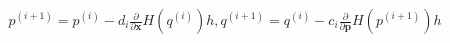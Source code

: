 \documentclass[preview]{standalone}
\begin{document}
\begin{align*}
p^{(i+1)}=p^{(i)}-d_i\frac{\partial}{\partial\mathbf x}H(q^{(i)})h ,  q^{(i+1)}=q^{(i)}-c_i\frac{\partial}{\partial\mathbf p}H(p^{(i+1)})h
\end{align*}
\end{document}
